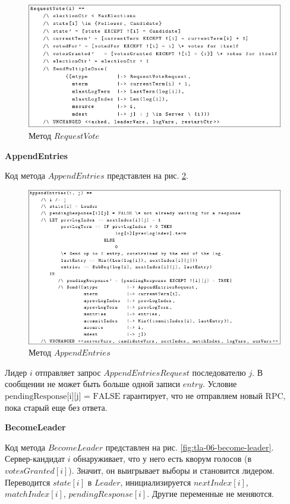 \begin{figure}
  \centering
  \includegraphics[scale=0.4]{inc/tla-06-request-vote.png}
  \caption{Метод $RequestVote$}
  \label{fig:tla-06-request-vote}
\end{figure}

\textbf{AppendEntries}

Код метода $AppendEntries$ представлен на рис. \ref{fig:tla-06-append-entries}.

\begin{figure}
  \centering
  \includegraphics[scale=0.4]{inc/tla-06-append-entries.png}
  \caption{Метод $AppendEntries$}
  \label{fig:tla-06-append-entries}
\end{figure}

Лидер $i$ отправляет запрос $AppendEntriesRequest$ последователю $j$. В сообщении
не может быть больше одной записи $entry$. Условие $\text{pendingResponse[i][j] = FALSE}$
гарантирует, что не отправляем новый RPC, пока старый еще без ответа.

\textbf{BecomeLeader}

Код метода $BecomeLeader$ представлен на рис. \ref{fig:tla-06-become-leader}.
Сервер-кандидат $i$ обнаруживает, что у него есть кворум голосов (в $votesGranted[i]$).
Значит, он выигрывает выборы и становится лидером. Переводится $state[i]$ в $Leader$,
инициализируется $nextIndex[i]$, $matchIndex[i]$, $pendingResponse[i]$. Другие
переменные не меняются.


